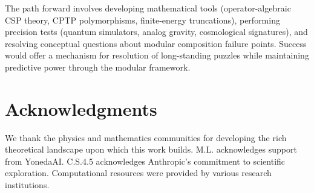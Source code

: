 \documentclass[11pt,a4paper]{article}
\theoremstyle{remark}
\theoremstyle{definition}
\begin{document}
The path forward involves developing mathematical tools (operator-algebraic CSP theory, CPTP polymorphisms, finite-energy truncations), performing precision tests (quantum simulators, analog gravity, cosmological signatures), and resolving conceptual questions about modular composition failure points. Success would offer a mechanism for resolution of long-standing puzzles while maintaining predictive power through the modular framework.

\section*{Acknowledgments}

We thank the physics and mathematics communities for developing the rich theoretical landscape upon which this work builds. M.L. acknowledges support from YonedaAI. C.S.4.5 acknowledges Anthropic's commitment to scientific exploration. Computational resources were provided by various research institutions.
\end{document}
